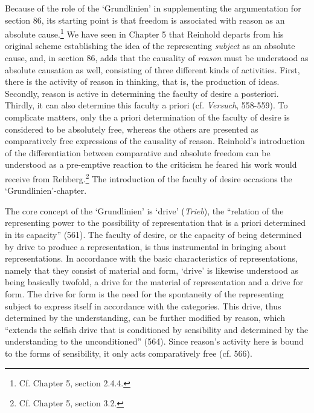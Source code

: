 Because of the role of the `Grundlinien' in supplementing the argumentation for section 86, its starting point is that freedom is associated with reason as an absolute cause.\footnote{ Cf. Chapter 5, section 2.4.4.} We have seen in Chapter 5 that Reinhold departs from his original scheme establishing the idea of the representing \textit{subject} as an absolute cause, and, in section 86, adds that the causality of \textit{reason} must be understood as absolute causation as well, consisting of three different kinds of activities. First, there is the activity of reason in thinking, that is, the production of ideas. Secondly, reason is active in determining the faculty of desire a posteriori. Thirdly, it can also determine this faculty a priori (cf. \textit{Versuch}, 558{-}559). To complicate matters, only the a priori determination of the faculty of desire is considered to be absolutely free, whereas the others are presented as comparatively free expressions of the causality of reason. Reinhold's introduction of the differentiation between comparative and absolute freedom can be understood as a pre{-}emptive reaction to the criticism he feared his work would receive from Rehberg.\footnote{ Cf. Chapter 5, section 3.2.} The introduction of the faculty of desire occasions the `Grundlinien'{-}chapter. 

 The core concept of the `Grundlinien' is `drive' (\textit{Trieb}), the ``relation of the representing power to the possibility of representation that is a priori determined in its capacity'' (561). The faculty of desire, or the capacity of being determined by drive to produce a representation, is thus instrumental in bringing about representations. In accordance with the basic characteristics of representations, namely that they consist of material and form, `drive' is likewise understood as being basically twofold, a drive for the material of representation and a drive for form. The drive for form is the need for the spontaneity of the representing subject to express itself in accordance with the categories. This drive, thus determined by the understanding, can be further modified by reason, which ``extends the selfish drive that is conditioned by sensibility and determined by the understanding to the unconditioned'' (564). Since reason's activity here is bound to the forms of sensibility, it only acts comparatively free (cf. 566).

